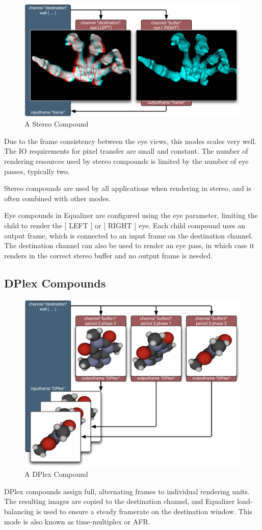\documentclass[10pt,a4]{scrartcl}
\begin{document}
\begin{figure}
  \includegraphics[width=.618\textwidth]{images/EYE.pdf}
  {\caption{\label{fStereoCmp}\small A Stereo Compound}}
\end{figure}
Due to the frame consistency between the eye views, this modes scales very
well. The IO requirements for pixel transfer are small and constant. The number
of rendering resources used by stereo compounds is limited by the number of eye
passes, typically two.

Stereo compounds are used by all applications when rendering in stereo,
and is often combined with other modes.

Eye compounds in Equalizer are configured using the \textsf{eye}
parameter, limiting the child to render the \textsf{[ LEFT ]} or
\textsf{[ RIGHT ]} eye. Each child compound uses an output frame, which
is connected to an input frame on the destination channel. The
destination channel can also be used to render an eye pass, in which case
it renders in the correct stereo buffer and no output frame is needed.


\subsection{\label{sDPlex}DPlex Compounds}

\begin{figure}
  \vspace{-2em}
  \includegraphics[width=.618\textwidth]{images/DPlex.pdf}
  {\caption{ A DPlex Compound}}
\end{figure}
DPlex compounds assign full, alternating frames to individual rendering
units. The resulting images are copied to the destination channel, and
Equalizer load-balancing is used to ensure a steady framerate on the
destination window. This mode is also known as time-multiplex or AFR.
\end{document}

